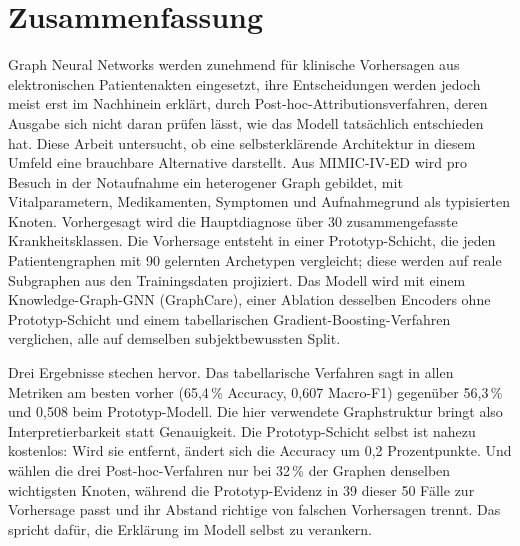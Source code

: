 \chapter*{Zusammenfassung}


Graph Neural Networks werden zunehmend für klinische Vorhersagen aus
elektronischen Patientenakten eingesetzt, ihre Entscheidungen werden jedoch
meist erst im Nachhinein erklärt, durch Post-hoc-Attributionsverfahren, deren
Ausgabe sich nicht daran prüfen lässt, wie das Modell tatsächlich entschieden
hat. Diese Arbeit untersucht, ob eine selbsterklärende Architektur in diesem
Umfeld eine brauchbare Alternative darstellt. Aus MIMIC-IV-ED wird pro Besuch in
der Notaufnahme ein heterogener Graph gebildet, mit Vitalparametern,
Medikamenten, Symptomen und Aufnahmegrund als typisierten Knoten. Vorhergesagt
wird die Hauptdiagnose über 30 zusammengefasste Krankheitsklassen. Die
Vorhersage entsteht in einer Prototyp-Schicht, die jeden Patientengraphen mit 90
gelernten Archetypen vergleicht; diese werden auf reale Subgraphen aus den
Trainingsdaten projiziert. Das Modell wird mit einem Knowledge-Graph-GNN
(GraphCare), einer Ablation desselben Encoders ohne Prototyp-Schicht und einem
tabellarischen Gradient-Boosting-Verfahren verglichen, alle auf demselben
subjektbewussten Split.

Drei Ergebnisse stechen hervor. Das tabellarische Verfahren sagt in allen
Metriken am besten vorher (65,4\,\% Accuracy, 0,607 Macro-F1) gegenüber
56,3\,\% und 0,508 beim Prototyp-Modell. Die hier verwendete Graphstruktur
bringt also Interpretierbarkeit statt Genauigkeit. Die Prototyp-Schicht selbst
ist nahezu kostenlos: Wird sie entfernt, ändert sich die Accuracy um 0,2
Prozentpunkte. Und  wählen die drei
Post-hoc-Verfahren nur bei 32\,\% der Graphen denselben wichtigsten Knoten,
während die Prototyp-Evidenz in 39 dieser 50 Fälle zur Vorhersage passt und ihr
Abstand richtige von falschen Vorhersagen trennt. Das spricht dafür, die Erklärung im Modell selbst zu
verankern.


